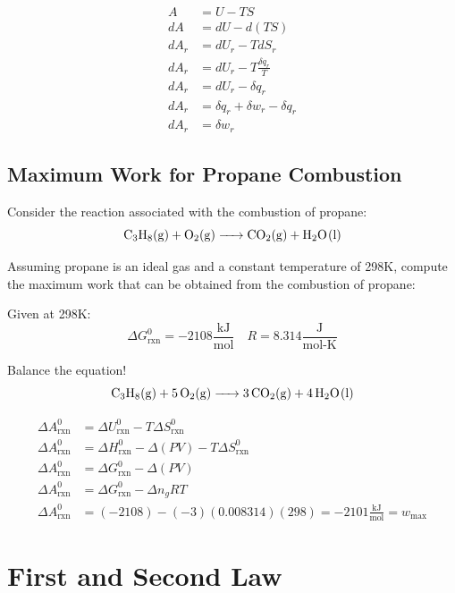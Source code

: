 \documentclass{article}
\newcommand{\be}{\begin{equation}}
\newcommand{\ee}{\end{equation}}
\begin{document}
\bigskip

\be
    \begin{split}
    A &= U - TS\\
     d A &= d U - d(TS) \\
        d A_r &= dU_r - T d S_r \\
      d A_r   &= d U_r - T\frac{\delta q_r}{T} \\
       d A_r  &= d U_r - \delta q_r \\
       d A_r  &= \delta q_r + \delta w_r - \delta q_r \\
        d A_r &= \delta w_r
    \end{split}
\ee

\subsection*{Maximum Work for Propane Combustion}
Consider the reaction associated with the combustion of propane: 
\be
\ce{C3H8(g) + O2(g) -> CO2(g) + H2O(l)}
\ee

Assuming propane is an ideal gas and a constant temperature of 298K, compute the maximum work that can be obtained from the combustion of propane: 

Given at 298K: 
\be
\Delta G_{\text{rxn}}^0 = -2108 \frac{\text{kJ}}{\text{mol}} \quad R = 8.314 \frac{\text{J}}{\text{mol-K}}
\ee

\bigskip

Balance the equation!
\be
\ce{C3H8(g) + 5O2(g) -> 3CO2(g) + 4H2O(l)}
\ee

\be
\begin{split}
\Delta A_{\text{rxn}}^0 &= \Delta U_{\text{rxn}}^0-T \Delta S_{\text{rxn}}^0 \\
\Delta A_{\text{rxn}}^0 &= \Delta H_{\text{rxn}}^0 - \Delta (PV) - T\Delta S_{\text{rxn}}^0\\
\Delta A_{\text{rxn}}^0 &= \Delta G_{\text{rxn}}^0 - \Delta (PV)\\
\Delta A_{\text{rxn}}^0 &= \Delta G_{\text{rxn}}^0 - \Delta n_g RT\\
\Delta A_{\text{rxn}}^0 &= (-2108)-(-3)(0.008314)(298) = -2101\frac{\text{kJ}}{\text{mol}} = w_{\text{max}}
\end{split}
\ee

\newpage

\section{First and Second Law}
\end{document}
